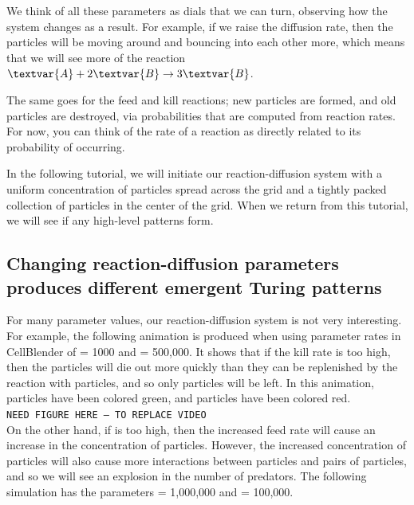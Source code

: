We think of all these parameters as dials that we can turn, observing how the system changes as a result. For example, if we raise the diffusion rate, then the particles will be moving around and bouncing into each other more, which means that we will see more of the reaction $\textvar{A} + 2\textvar{B} \rightarrow 3\textvar{B}$.\\

\begin{qbox}\end{qbox}

The same goes for the feed and kill reactions; new  particles are formed, and old  particles are destroyed, via probabilities that are computed from reaction rates. For now, you can think of the rate of a reaction as directly related to its probability of occurring.

In the following tutorial, we will initiate our reaction-diffusion system with a uniform concentration of  particles spread across the grid and a tightly packed collection of  particles in the center of the grid. When we return from this tutorial, we will see if any high-level patterns form.


\FloatBarrier
{}
\subsection{Changing reaction-diffusion parameters produces different emergent Turing patterns}

For many parameter values, our reaction-diffusion system is not very interesting.  For example, the following animation is produced when using parameter rates in CellBlender of  = 1000 and  = 500,000.  It shows that if the kill rate is too high, then the  particles will die out more quickly than they can be replenished by the reaction with  particles, and so only  particles will be left. In this animation,  particles have been colored green, and  particles have been colored red.\\

\texttt{NEED FIGURE HERE -- TO REPLACE VIDEO}\\

On the other hand, if  is too high, then the increased feed rate will cause an increase in the concentration of  particles. However, the increased concentration of  particles will also cause more interactions between  particles and pairs of  particles, and so we will see an explosion in the number of predators. The following simulation has the parameters  = 1,000,000 and  = 100,000.\\

